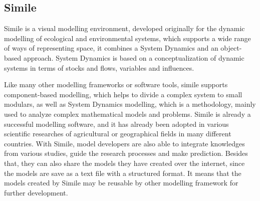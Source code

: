 \subsection{Simile}\label{sec:similie}
\par
Simile is a visual modelling environment, developed originally for the dynamic modelling of ecological and environmental systems, which supports a wide range of ways of representing space, it combines a System Dynamics and an object-based approach. System Dynamics is based on a conceptualization of dynamic systems in terms of stocks and flows, variables and influences. \autocite{dsl:simile-simulistics}
\par
Like many other modelling frameworks or software tools, simile supports component-based modelling, which helps to divide a complex system to small modulars, as well as System Dynamics modelling, which is a methodology, mainly used to analyze complex mathematical models and problems. Simile is already a successful modelling software, and it has already been adopted in various scientific researches of agricultural or geographical fields in many different countries. With Simile, model developers are also able to integrate knowledges from various studies, guide the research processes and make prediction. Besides that, they can also share the models they have created over the internet, since the models are save as a text file with a structured format. \autocite{dsl:simile-muetzelfeldt} It means that the models created by Simile may be reusable by other modelling framework for further development.
